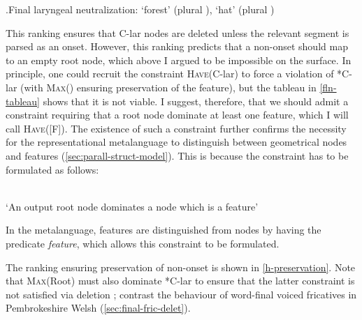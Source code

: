 \ex.\label{fln-tableau}Final laryngeal neutralization: \ipa{[ˈkwæd̥]} `forest' (plural \ipa{[ˈkwæʒəw]}), \ipa{[ˈtɔɡ̊]} `hat' (plural \ipa{[ˈtɔkəw]})\\

This ranking ensures that C-lar nodes are deleted unless the relevant segment is parsed as an onset. However, this ranking predicts that a non-onset \ipa{[h]} should map to an empty root node, which above I argued to be impossible on the surface. In principle, one could recruit the constraint \textsc{Have}(C-lar) to force a violation of *C-lar (with \textsc{Max}() ensuring preservation of the feature), but the tableau in \ref{fln-tableau} shows that it is not viable. I suggest, therefore, that we should admit a constraint requiring that a root node dominate at least one feature, which I will call \textsc{Have}([F]). The existence of such a constraint further confirms the necessity for the representational metalanguage to distinguish between geometrical nodes and features (\cref{sec:parall-struct-model}). This is because the constraint has to be formulated as follows:

\begin{constraint}
  \\
  `An output root node dominates a node which is a feature'
\end{constraint}

In the metalanguage, features are distinguished from nodes by having the predicate \emph{feature}, which allows this constraint to be formulated.

The ranking ensuring preservation of non-onset \ipa{[h]} is shown in \ref{h-preservation}. Note that \textsc{Max}\hspace{0pt}(Root) must also dominate *C-lar to ensure that the latter constraint is not satisfied via deletion \citep{lombardi01:_why_place_voice}; contrast the behaviour of word-final voiced fricatives in Pembrokeshire Welsh (\cref{sec:final-fric-delet}).


